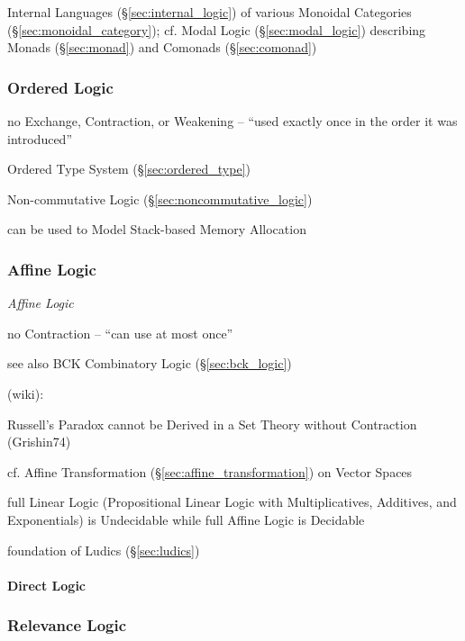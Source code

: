 Internal Languages (\S\ref{sec:internal_logic}) of various Monoidal
Categories (\S\ref{sec:monoidal_category}); cf. Modal Logic
(\S\ref{sec:modal_logic}) describing Monads (\S\ref{sec:monad}) and
Comonads (\S\ref{sec:comonad})



\subsubsection{Ordered Logic}\label{sec:ordered_logic}\hfill

no Exchange, Contraction, or Weakening -- ``used exactly once in the
order it was introduced''

\fist Ordered Type System (\S\ref{sec:ordered_type})

\fist Non-commutative Logic (\S\ref{sec:noncommutative_logic})

can be used to Model Stack-based Memory Allocation



\subsubsection{Affine Logic}\label{sec:affine_logic}

\emph{Affine Logic}

no Contraction -- ``can use at most once''

\fist see also BCK Combinatory Logic (\S\ref{sec:bck_logic})

(wiki):

Russell's Paradox cannot be Derived in a Set Theory without
Contraction (Grishin74)

cf. Affine Transformation (\S\ref{sec:affine_transformation}) on
Vector Spaces

full Linear Logic (Propositional Linear Logic with Multiplicatives,
Additives, and Exponentials) is Undecidable while full Affine Logic is
Decidable

foundation of Ludics (\S\ref{sec:ludics})



\paragraph{Direct Logic}\label{sec:direct_logic}\hfill



\subsubsection{Relevance Logic}\label{sec:relevance_logic}

